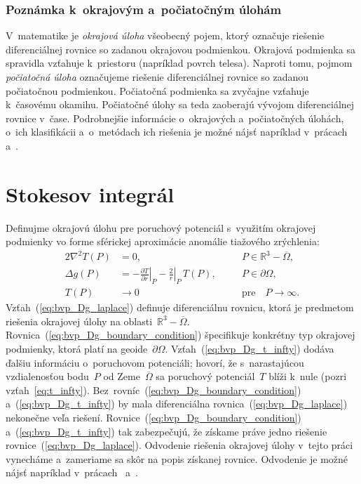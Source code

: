 \documentclass[a4paper, 12pt]{book}
\begin{document}
\subsubsection{Poznámka k~okrajovým a~počiatočným úlohám}

V~matematike je \emph{okrajová úloha} všeobecný pojem, ktorý označuje riešenie 
diferenciálnej rovnice so zadanou okrajovou podmienkou.  Okrajová podmienka sa 
spravidla vzťahuje k~priestoru (napríklad povrch telesa).  Naproti tomu, pojmom 
\emph{počiatočná úloha} označujeme riešenie diferenciálnej rovnice so zadanou 
počiatočnou podmienkou.  Počiatočná podmienka sa zvyčajne vzťahuje k~časovému 
okamihu.  Počiatočné úlohy sa teda zaoberajú vývojom diferenciálnej rovnice 
v~čase.  Podrobnejšie informácie o~okrajových a~počiatočných úlohách, o~ich 
klasifikácii a~o~metódach ich riešenia je možné nájsť napríklad v~prácach 
\textcite{Janak2006} a~\textcite{Macak2021}.



\section{Stokesov integrál}
\label{sec:stokes_integral}

Definujme okrajovú úlohu pre poruchový potenciál s~využitím okrajovej podmienky 
vo forme sférickej aproximácie anomálie tiažového zrýchlenia:
%
\begin{alignat}{2}
\nabla^2 T(P) &= 0{,} &&P \in \mathbb{R}^3 
- \overline\Omega{,}\label{eq:bvp_Dg_laplace}\\
\Delta g(P) &= -\left.\frac{\partial T}{\partial r}\right|_P 
- \left.\frac{2}{r}\right|_P \, T(P){,} \quad &&P \in 
\partial\Omega{,}\label{eq:bvp_Dg_boundary_condition}\\
T(P) &\rightarrow 0 &&\textrm{pre} \quad P \rightarrow 
\infty{.}\label{eq:bvp_Dg_t_infty}
\end{alignat}
%
Vzťah~(\ref{eq:bvp_Dg_laplace}) definuje diferenciálnu rovnicu, ktorá je 
predmetom riešenia okrajovej úlohy na oblasti~$\mathbb{R}^3 - \overline\Omega$.  
Rovnica~(\ref{eq:bvp_Dg_boundary_condition}) špecifikuje konkrétny typ 
okrajovej podmienky, ktorá platí na geoide~$\partial\Omega$.  
Vzťah~(\ref{eq:bvp_Dg_t_infty}) dodáva ďalšiu informáciu o~poruchovom 
potenciáli; hovorí, že s~narastajúcou vzdialenosťou bodu~$P$ od 
Zeme~$\overline\Omega$ sa poruchový potenciál~$T$ blíži k~nule (pozri 
vzťah~\ref{eq:t_infty}).  Bez~rovníc~(\ref{eq:bvp_Dg_boundary_condition}) 
a~(\ref{eq:bvp_Dg_t_infty}) by mala diferenciálna 
rovnica~(\ref{eq:bvp_Dg_laplace}) nekonečne veľa riešení.  
Rovnice~(\ref{eq:bvp_Dg_boundary_condition}) a~(\ref{eq:bvp_Dg_t_infty}) tak 
zabezpečujú, že získame práve jedno riešenie rovnice~(\ref{eq:bvp_Dg_laplace}).  
Odvodenie riešenia okrajovej úlohy v~tejto práci vynecháme a~zameriame sa skôr 
na popis získanej rovnice.  Odvodenie je možné nájsť napríklad 
v~prácach~\textcite{MoritzPhysicalGeodesy} a~\textcite{Janak2006}.
\end{document}
